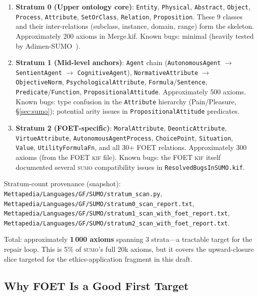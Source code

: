 \documentclass[11pt]{article}
\newcommand{\KIF}{\textsc{kif}}
\newcommand{\SUMO}{\textsc{sumo}}
\theoremstyle{definition}
\theoremstyle{plain}
\begin{document}
\begin{enumerate}
  \item \textbf{Stratum 0 (Upper ontology core)}: \texttt{Entity},
    \texttt{Physical}, \texttt{Abstract}, \texttt{Object},
    \texttt{Process}, \texttt{Attribute}, \texttt{SetOrClass},
    \texttt{Relation}, \texttt{Proposition}.
    These 9 classes and their inter-relations (subclass, instance,
    domain, range) form the skeleton.  Approximately 200 axioms in
    Merge.kif.  Known bugs: minimal (heavily tested by
    Adimen-SUMO~\cite{alvez2012adimensumo}).

  \item \textbf{Stratum 1 (Mid-level anchors)}: \texttt{Agent} chain
    (\texttt{AutonomousAgent} $\to$ \texttt{SentientAgent} $\to$
    \texttt{CognitiveAgent}), \texttt{NormativeAttribute} $\to$
    \texttt{ObjectiveNorm}, \texttt{PsychologicalAttribute},
    \texttt{Formula}/\texttt{Sentence}, \texttt{Predicate}/\texttt{Function},
    \texttt{PropositionalAttitude}.
    Approximately 500 axioms.  Known bugs: type confusion in the
    \texttt{Attribute} hierarchy (Pain/Pleasure,
    \S\ref{sec:sumo}); potential arity issues in
    \texttt{PropositionalAttitude} predicates.

  \item \textbf{Stratum 2 (FOET-specific)}: \texttt{MoralAttribute},
    \texttt{DeonticAttribute}, \texttt{VirtueAttribute},
    \texttt{AutonomousAgentProcess}, \texttt{ChoicePoint},
    \texttt{Situation}, \texttt{Value}, \texttt{UtilityFormulaFn},
    and all 30+ FOET relations.
    Approximately 300 axioms (from the FOET \KIF{} file).
    Known bugs: the FOET \KIF{} itself documented several
    \SUMO{} compatibility issues in
    \texttt{ResolvedBugsInSUMO.kif}.
\end{enumerate}
Stratum-count provenance (snapshot): \texttt{Mettapedia/Languages/GF/SUMO/stratum\_scan.py},
\texttt{Mettapedia/Languages/GF/SUMO/stratum0\_scan\_report.txt},
\texttt{Mettapedia/Languages/GF/SUMO/stratum1\_scan\_with\_foet\_report.txt},
\texttt{Mettapedia/Languages/GF/SUMO/stratum2\_scan\_with\_foet\_report.txt}.

Total: approximately \textbf{1\,000 axioms} spanning 3 strata---a
tractable target for the repair loop.  This is 5\% of \SUMO{}'s full
20k axioms, but it covers the upward-closure slice targeted for the
ethics-application fragment in this draft.

\subsection{Why FOET Is a Good First Target}
\end{document}
